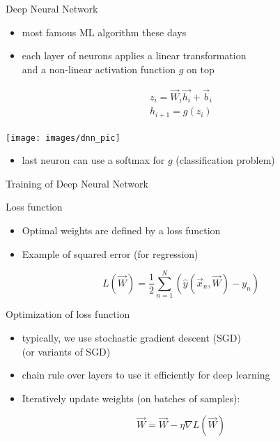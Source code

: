 \begin{frame}[c]{Deep Neural Network}

\begin{itemize}
  \item most famous ML algorithm these days
  \item each layer of neurons applies a linear transformation\\
   and a non-linear activation function  $g$ on top 
\end{itemize}

\begin{eqnarray}
z_i = \vec{W}_i\vec{h_i} + \vec{b}_i\\
h_{i+1} = g(z_i)
\end{eqnarray}



\centering
\texttt{[image: images/dnn\_pic]}

\begin{itemize}
  \item last neuron can use a softmax for $g$ (classification problem)
\end{itemize}

\end{frame}
\begin{frame}[c]{Training of Deep Neural Network}

\begin{block}{Loss function}
\begin{itemize}
  \item Optimal weights are defined by a loss function
  \item Example of squared error (for regression)
\end{itemize}

\begin{equation}
L(\vec{W}) = \frac{1}{2} \sum_{n=1}^N \left( \hat{y}(\vec{x}_n, \vec{W}) - y_n  \right)
\end{equation}
\end{block}

\pause

\begin{block}{Optimization of loss function}
\begin{itemize}
  \item typically, we use stochastic gradient descent (SGD)\\
  (or variants of SGD)
  \item chain rule over layers to use it efficiently for deep learning
  \item Iteratively update weights (on batches of samples):
\end{itemize}

\begin{equation}
\vec{W} = \vec{W} - \eta \nabla L(\vec{W})
\end{equation}

\end{block}

\end{frame}
